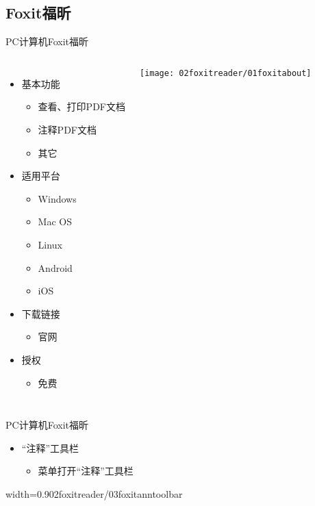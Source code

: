 \documentclass[fontset = none, t, aspectratio=169]{ctexbeamer}
\begin{document}
\subsection{Foxit福昕}
\begin{frame}{PC计算机}{Foxit福昕}
  \begin{columns}[c]
    \begin{itemize}
    \item 基本功能
      \begin{itemize}
      \item 查看、打印PDF文档
      \item \alert{注释}PDF文档
      \item 其它
      \end{itemize}
    \item 适用平台
      \begin{itemize}
      \item Windows
      \item Mac OS
      \item Linux
      \item Android
      \item iOS
      \end{itemize}
    \item 下载链接
      \begin{itemize}
      \item 官网
      \end{itemize}
    \item 授权
      \begin{itemize}
      \item \alert{免费}
      \end{itemize}
    \end{itemize}
    \texttt{[image: 02foxitreader/01foxitabout]}
  \end{columns}
\end{frame}

\begin{frame}{PC计算机}{Foxit福昕}
  \begin{itemize}
  \item \enquote{注释}工具栏
    \begin{itemize}
    \item {}菜单打开\enquote{注释}工具栏
    \end{itemize}
  \end{itemize}
  \begin{center}
    \begin{annotationimage}{width=0.9\textwidth}{02foxitreader/03foxitanntoolbar}
    \end{annotationimage}
  \end{center}
\end{frame}
\end{document}

